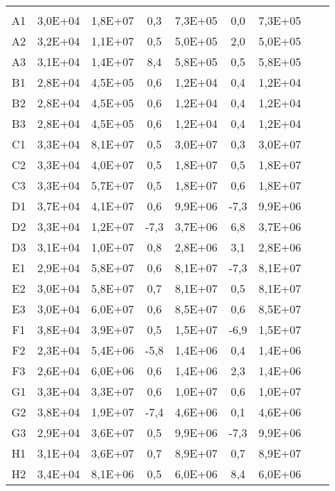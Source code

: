 \begin{center}
\begin{longtable}{ccccccccc}
\toprule
\endhead
\midrule \\ %
\endfoot
\bottomrule 
\endlastfoot
A1    & 3,0E+04 & 1,8E+07 & 0,3   & 7,3E+05 & 0,0   & 7,3E+05 \\
A2    & 3,2E+04 & 1,1E+07 & 0,5   & 5,0E+05 & 2,0   & 5,0E+05 \\
A3    & 3,1E+04 & 1,4E+07 & 8,4   & 5,8E+05 & 0,5   & 5,8E+05 \\
B1    & 2,8E+04 & 4,5E+05 & 0,6   & 1,2E+04 & 0,4   & 1,2E+04 \\
B2    & 2,8E+04 & 4,5E+05 & 0,6   & 1,2E+04 & 0,4   & 1,2E+04 \\
B3    & 2,8E+04 & 4,5E+05 & 0,6   & 1,2E+04 & 0,4   & 1,2E+04 \\
C1    & 3,3E+04 & 8,1E+07 & 0,5   & 3,0E+07 & 0,3   & 3,0E+07 \\
C2    & 3,3E+04 & 4,0E+07 & 0,5   & 1,8E+07 & 0,5   & 1,8E+07 \\
C3    & 3,3E+04 & 5,7E+07 & 0,5   & 1,8E+07 & 0,6   & 1,8E+07 \\
D1    & 3,7E+04 & 4,1E+07 & 0,6   & 9,9E+06 & -7,3  & 9,9E+06 \\
D2    & 3,3E+04 & 1,2E+07 & -7,3  & 3,7E+06 & 6,8   & 3,7E+06 \\
D3    & 3,1E+04 & 1,0E+07 & 0,8   & 2,8E+06 & 3,1   & 2,8E+06 \\
E1    & 2,9E+04 & 5,8E+07 & 0,6   & 8,1E+07 & -7,3  & 8,1E+07 \\
E2    & 3,0E+04 & 5,8E+07 & 0,7   & 8,1E+07 & 0,5   & 8,1E+07 \\
E3    & 3,0E+04 & 6,0E+07 & 0,6   & 8,5E+07 & 0,6   & 8,5E+07 \\
F1    & 3,8E+04 & 3,9E+07 & 0,5   & 1,5E+07 & -6,9  & 1,5E+07 \\
F2    & 2,3E+04 & 5,4E+06 & -5,8  & 1,4E+06 & 0,4   & 1,4E+06 \\
F3    & 2,6E+04 & 6,0E+06 & 0,6   & 1,4E+06 & 2,3   & 1,4E+06 \\
G1    & 3,3E+04 & 3,3E+07 & 0,6   & 1,0E+07 & 0,6   & 1,0E+07 \\
G2    & 3,8E+04 & 1,9E+07 & -7,4  & 4,6E+06 & 0,1   & 4,6E+06 \\
G3    & 2,9E+04 & 3,6E+07 & 0,5   & 9,9E+06 & -7,3  & 9,9E+06 \\
H1    & 3,1E+04 & 3,6E+07 & 0,7   & 8,9E+07 & 0,7   & 8,9E+07 \\
H2    & 3,4E+04 & 8,1E+06 & 0,5   & 6,0E+06 & 8,4   & 6,0E+06 \\

\end{longtable}
\end{center}
